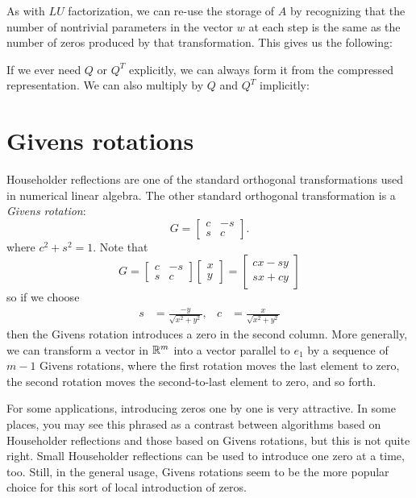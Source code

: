 \documentclass[12pt, leqno]{article}
\begin{document}
As with $LU$ factorization, we can re-use the storage of $A$ by recognizing
that the number of nontrivial parameters in the vector $w$ at each step
is the same as the number of zeros produced by that transformation.
This gives us the following:


If we ever need $Q$ or $Q^T$ explicitly, we can always form it from
the compressed representation.  We can also multiply by $Q$ and $Q^T$
implicitly:



\section*{Givens rotations}

Householder reflections are one of the standard orthogonal
transformations used in numerical linear algebra.  The other standard
orthogonal transformation is a {\em Givens rotation}:
\[
  G = \begin{bmatrix}
    c & -s \\
    s & c
  \end{bmatrix}.
\]
where $c^2 + s^2 = 1$.  Note that
\[
  G = \begin{bmatrix}
    c & -s \\
    s & c
  \end{bmatrix}
  \begin{bmatrix}
    x \\ y
  \end{bmatrix} =
  \begin{bmatrix}
    cx - sy \\
    sx + cy
  \end{bmatrix}
\]
so if we choose
\begin{align*}
  s &= \frac{-y}{\sqrt{x^2 + y^2}}, &
  c &= \frac{x}{\sqrt{x^2+y^2}}
\end{align*}
then the Givens rotation introduces a zero in the second column.
More generally, we can transform a vector in $\mathbb{R}^m$ into a vector
parallel to $e_1$ by a sequence of $m-1$ Givens rotations, where
the first rotation moves the last element to zero, the second rotation
moves the second-to-last element to zero, and so forth.

For some applications, introducing zeros one by one is very
attractive.  In some places, you may see this phrased as a contrast
between algorithms based on Householder reflections and those based on
Givens rotations, but this is not quite right.  Small Householder
reflections can be used to introduce one zero at a time, too.
Still, in the general usage, Givens rotations seem to be the more
popular choice for this sort of local introduction of zeros.
\end{document}

